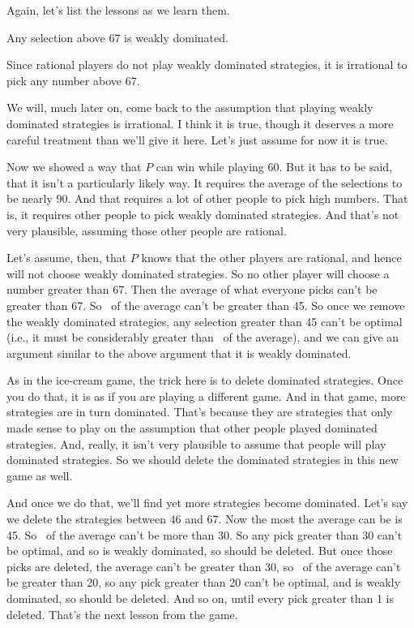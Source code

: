 Again, let's list the lessons as we learn them.

\begin{itemize*}
\item Any selection above 67 is weakly dominated.
\item Since rational players do not play weakly dominated strategies, it is irrational to pick any number above 67.
\end{itemize*}

\noindent We will, much later on, come back to the assumption that playing weakly dominated strategies is irrational. I think it is true, though it deserves a more careful treatment than we'll give it here. Let's just assume for now it is true.

Now we showed a way that $P$ can win while playing 60. But it has to be said, that it isn't a particularly likely way. It requires the average of the selections to be nearly 90. And that requires a lot of other people to pick high numbers. That is, it requires other people to pick weakly dominated strategies. And that's not very plausible, assuming those other people are rational.

Let's assume, then, that $P$ knows that the other players are rational, and hence will not choose weakly dominated strategies. So no other player will choose a number greater than 67. Then the average of what everyone picks can't be greater than 67. So \twothirds\ of the average can't be greater than 45. So once we remove the weakly dominated strategies, any selection greater than 45 can't be optimal (i.e., it must be considerably greater than \twothirds\ of the average), and we can give an argument similar to the above argument that it is weakly dominated.

As in the ice-cream game, the trick here is to delete dominated strategies. Once you do that, it is as if you are playing a different game. And in that game, more strategies are in turn dominated. That's because they are strategies that only made sense to play on the assumption that other people played dominated strategies. And, really, it isn't very plausible to assume that people will play dominated strategies. So we should delete the dominated strategies in this new game as well.

And once we do that, we'll find yet more strategies become dominated. Let's say we delete the strategies between 46 and 67. Now the most the average can be is 45. So \twothirds\ of the average can't be more than 30. So any pick greater than 30 can't be optimal, and so is weakly dominated, so should be deleted. But once those picks are deleted, the average can't be greater than 30, so \twothirds\ of the average can't be greater than 20, so any pick greater than 20 can't be optimal, and is weakly dominated, so should be deleted. And so on, until every pick greater than 1 is deleted. That's the next lesson from the game.

